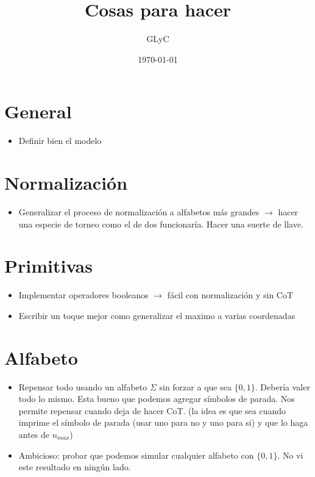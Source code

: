 \documentclass{article}
\title{Cosas para hacer}
\author{GLyC}
\date{\today}
\begin{document}
\maketitle


\section{General}

\begin{itemize}
    \item Definir bien el modelo
\end{itemize}




\section{Normalización}

\begin{itemize}
    \item Generalizar el proceso de normalización a alfabetos más grandes $\rightarrow$ hacer una especie de torneo como el de dos funcionaría. Hacer una suerte de llave.
\end{itemize}




\section{Primitivas}

\begin{itemize}
    \item Implementar operadores booleanos $\rightarrow$ fácil con normalización y sin CoT
    \item Escribir un toque mejor como generalizar el maximo a varias coordenadas
\end{itemize}


\section{Alfabeto}

\begin{itemize}
    \item Repensar todo usando un alfabeto $\Sigma$ sin forzar a que sea $\{0,1\}$. Debería valer todo lo mismo. Esta bueno que podemos agregar símbolos de parada. Nos permite repensar cuando deja de hacer CoT. (la idea es que sea cuando imprime el símbolo de parada (usar uno para no y uno para si) y que lo haga antes de $n_{max}$)
    \item Ambicioso: probar que podemos simular cualquier alfabeto con $\{0,1\}$. No vi este resultado en ningún lado.
\end{itemize}
\end{document}
